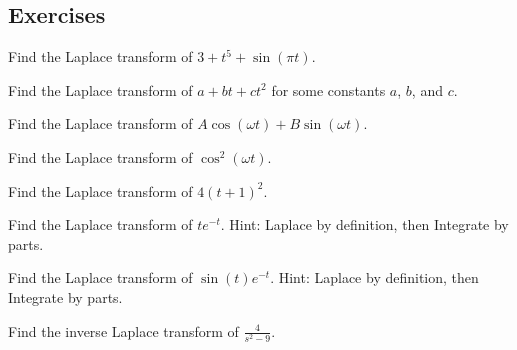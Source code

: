 \subsection{Exercises}

\begin{exercise}
Find the Laplace transform of $3+t^5+\sin (\pi t)$.
\end{exercise}

\begin{exercise}
Find the Laplace transform of $a+bt+ct^2$ for some constants $a$, $b$, and
$c$.
\end{exercise}

\begin{exercise}
Find the Laplace transform of $A \cos (\omega t) + B \sin (\omega t)$.
\end{exercise}

\begin{exercise}
Find the Laplace transform of $\cos^2 (\omega t)$.
\end{exercise}

\begin{exercise}
	Find the Laplace transform of $4{(t+1)}^2$.
\end{exercise}

\begin{exercise}
	Find the Laplace transform of $te^{-t}$.  Hint: Laplace by definition, then Integrate by parts.
\end{exercise}

\begin{exercise}
	Find the Laplace transform of $\sin(t)e^{-t}$.  Hint: Laplace by definition, then Integrate by parts.
\end{exercise}

\begin{exercise}
Find the inverse Laplace transform of $\frac{4}{s^2-9}$.
\end{exercise}

